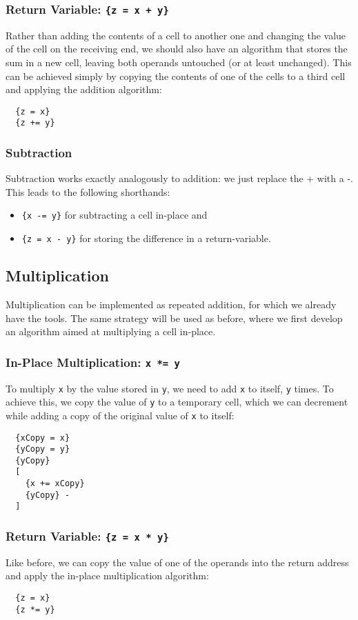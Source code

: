 \subsubsection{Return Variable: \texttt{\{z = x + y\}}}
Rather than adding the contents of a cell to another one and changing the value of the cell on the receiving end, we should also have an algorithm that stores the sum in a new cell, leaving both operands untouched (or at least unchanged). This can be achieved simply by copying the contents of one of the cells to a third cell and applying the addition algorithm:
\begin{lstlisting}
  {z = x}
  {z += y}
\end{lstlisting}

\subsubsection{Subtraction}
Subtraction works exactly analogously to addition: we just replace the + with a -. This leads to the following shorthands:
\begin{itemize}
\item \texttt{\{x -= y\}} for subtracting a cell in-place and
\item \texttt{\{z = x - y\}} for storing the difference in a return-variable.
\end{itemize}

\subsection{Multiplication}
Multiplication can be implemented as repeated addition, for which we already have the tools. The same strategy will be used as before, where we first develop an algorithm aimed at multiplying a cell in-place.
\subsubsection{In-Place Multiplication: \texttt{x *= y}}
To multiply \texttt{x} by the value stored in \texttt{y}, we need to add \texttt{x} to itself, \texttt{y} times. To achieve this, we copy the value of \texttt{y} to a temporary cell, which we can decrement while adding a copy of the original value of \texttt{x} to itself:
\begin{lstlisting}
  {xCopy = x}
  {yCopy = y}
  {yCopy}
  [
    {x += xCopy}
    {yCopy} -
  ]
\end{lstlisting}

\subsubsection{Return Variable: \texttt{\{z = x * y\}}}
Like before, we can copy the value of one of the operands into the return address and apply the in-place multiplication algorithm:
\begin{lstlisting}
  {z = x}
  {z *= y}
\end{lstlisting}


